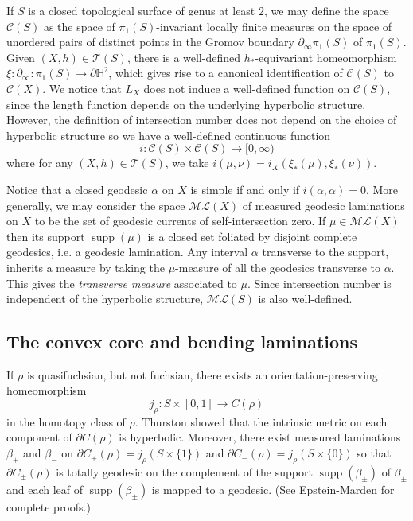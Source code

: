 \documentclass{amsart}
\theoremstyle{plain}
\theoremstyle{definition}
\theoremstyle{remark}
\newcommand{\supp}{{\operatorname{supp}}}
\newcommand{\<}{\left <}
\renewcommand{\>}{\right >}
\begin{document}
If $S$ is a closed topological surface of genus at least $2$, we may define the space $\mathcal C(S)$ as the space of 
$\pi_1(S)$-invariant locally finite measures on the space of unordered pairs of distinct points in the Gromov boundary
$\partial_\infty\pi_1(S)$ of $\pi_1(S)$. Given $(X,h)\in\mathcal T(S)$, there is a well-defined
$h_*$-equivariant homeomorphism
$\xi:\partial_\infty:\pi_1(S)\to \partial \mathbb H^2$, which gives rise to a canonical identification of $\mathcal C(S)$
to $\mathcal C(X)$. We notice that $L_X$ does not induce a well-defined function on $\mathcal C(S)$, since the length
function depends on the underlying hyperbolic structure. However, the definition of intersection number does not
depend on the choice of hyperbolic structure so we have a well-defined continuous function
$$i:\mathcal C(S)\times\mathcal C(S)\to [0,\infty)$$
where for any $(X,h)\in\mathcal T(S)$, we take  $i(\mu,\nu)=i_X(\xi_*(\mu),\xi_*(\nu))$.

Notice that a closed geodesic $\alpha$ on $X$ is simple if and only if $i(\alpha,\alpha)=0$. More generally, we may consider the 
space  $\mathcal{ML}(X)$ of measured geodesic laminations on $X$ to be the set of geodesic currents of self-intersection zero.
If $\mu \in \mathcal{ML}(X)$ then its support $\supp(\mu)$ is a closed set foliated by disjoint complete geodesics, i.e. a
geodesic lamination.
Any interval $\alpha$ transverse to the support, inherits a measure by taking the $\mu$-measure of all the geodesics transverse to $\alpha$. 
This gives the {\em transverse measure} associated to $\mu$. Since intersection number is independent of the hyperbolic structure,
$\mathcal{ML}(S)$ is also well-defined.






\subsection{The convex core and bending laminations}
If $\rho$ is  quasifuchsian, but not fuchsian, there exists an orientation-preserving  homeomorphism 
$$j_\rho:S\times [0,1]\to C(\rho)$$ in the homotopy class
of $\rho$. Thurston \cite{thurston-notes} showed that the intrinsic metric on each component of $\partial C(\rho)$ is hyperbolic. 
Moreover, there exist measured laminations $\beta_+$ and $\beta_-$ on $\partial C_+(\rho)=j_\rho(S\times \{1\})$ and 
$\partial C_-(\rho)=j_\rho(S\times \{0\})$ so that $\partial C_\pm(\rho)$ is totally geodesic on the complement of  the support $\supp(\beta_\pm)$ 
of $\beta_\pm$ and
each leaf of $\supp(\beta_\pm)$ is mapped to a geodesic. (See Epstein-Marden \cite{EM} for complete proofs.) 
\end{document}

